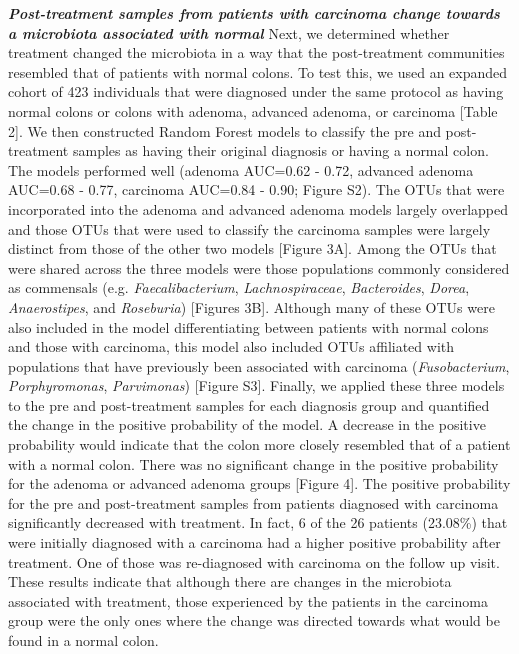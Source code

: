 \documentclass[12pt,]{article}
\begin{document}
\textbf{\emph{Post-treatment samples from patients with carcinoma change
towards a microbiota associated with normal}} Next, we determined
whether treatment changed the microbiota in a way that the
post-treatment communities resembled that of patients with normal
colons. To test this, we used an expanded cohort of 423 individuals that
were diagnosed under the same protocol as having normal colons or colons
with adenoma, advanced adenoma, or carcinoma {[}Table 2{]}. We then
constructed Random Forest models to classify the pre and post-treatment
samples as having their original diagnosis or having a normal colon. The
models performed well (adenoma AUC=0.62 - 0.72, advanced adenoma
AUC=0.68 - 0.77, carcinoma AUC=0.84 - 0.90; Figure S2). The OTUs that
were incorporated into the adenoma and advanced adenoma models largely
overlapped and those OTUs that were used to classify the carcinoma
samples were largely distinct from those of the other two models
{[}Figure 3A{]}. Among the OTUs that were shared across the three models
were those populations commonly considered as commensals (e.g.
\emph{Faecalibacterium}, \emph{Lachnospiraceae}, \emph{Bacteroides},
\emph{Dorea}, \emph{Anaerostipes}, and \emph{Roseburia}) {[}Figures
3B{]}. Although many of these OTUs were also included in the model
differentiating between patients with normal colons and those with
carcinoma, this model also included OTUs affiliated with populations
that have previously been associated with carcinoma
(\emph{Fusobacterium}, \emph{Porphyromonas}, \emph{Parvimonas})
{[}Figure S3{]}. Finally, we applied these three models to the pre and
post-treatment samples for each diagnosis group and quantified the
change in the positive probability of the model. A decrease in the
positive probability would indicate that the colon more closely
resembled that of a patient with a normal colon. There was no
significant change in the positive probability for the adenoma or
advanced adenoma groups {[}Figure 4{]}. The positive probability for the
pre and post-treatment samples from patients diagnosed with carcinoma
significantly decreased with treatment. In fact, 6 of the 26 patients
(23.08\%) that were initially diagnosed with a carcinoma had a higher
positive probability after treatment. One of those was re-diagnosed with
carcinoma on the follow up visit. These results indicate that although
there are changes in the microbiota associated with treatment, those
experienced by the patients in the carcinoma group were the only ones
where the change was directed towards what would be found in a normal
colon.
\end{document}
